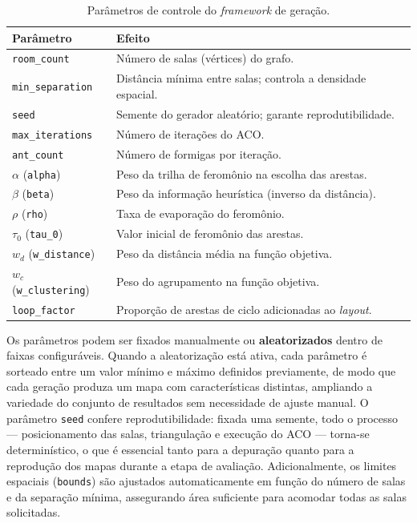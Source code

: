 \documentclass[12pt]{article}
\begin{document}
\begin{table}[htb]
\centering
\caption{Parâmetros de controle do \textit{framework} de geração.}
\label{tab:params}
\begin{tabular}{p{} p{}}
\hline
\textbf{Parâmetro} & \textbf{Efeito} \\
\hline
\texttt{room\_count} & Número de salas (vértices) do grafo. \\
\texttt{min\_separation} & Distância mínima entre salas; controla a densidade espacial. \\
\texttt{seed} & Semente do gerador aleatório; garante reprodutibilidade. \\
\texttt{max\_iterations} & Número de iterações do ACO. \\
\texttt{ant\_count} & Número de formigas por iteração. \\
$\alpha$ (\texttt{alpha}) & Peso da trilha de feromônio na escolha das arestas. \\
$\beta$ (\texttt{beta}) & Peso da informação heurística (inverso da distância). \\
$\rho$ (\texttt{rho}) & Taxa de evaporação do feromônio. \\
$\tau_0$ (\texttt{tau\_0}) & Valor inicial de feromônio das arestas. \\
$w_d$ (\texttt{w\_distance}) & Peso da distância média na função objetiva. \\
$w_c$ (\texttt{w\_clustering}) & Peso do agrupamento na função objetiva. \\
\texttt{loop\_factor} & Proporção de arestas de ciclo adicionadas ao \textit{layout}. \\
\hline
\end{tabular}
\end{table}
 
Os parâmetros podem ser fixados manualmente ou \textbf{aleatorizados} dentro de faixas configuráveis. Quando a aleatorização está
ativa, cada parâmetro é sorteado entre um valor mínimo e máximo definidos previamente, de modo que cada geração produza um mapa
com características distintas, ampliando a variedade do conjunto de resultados sem necessidade de ajuste manual. O parâmetro
\texttt{seed} confere reprodutibilidade: fixada uma semente, todo o processo — posicionamento das salas, triangulação e execução
do ACO — torna-se determinístico, o que é essencial tanto para a depuração quanto para a reprodução dos mapas durante a etapa de
avaliação. Adicionalmente, os limites espaciais (\texttt{bounds}) são ajustados automaticamente em função do número de salas e da
separação mínima, assegurando área suficiente para acomodar todas as salas solicitadas.
 
\end{document}

